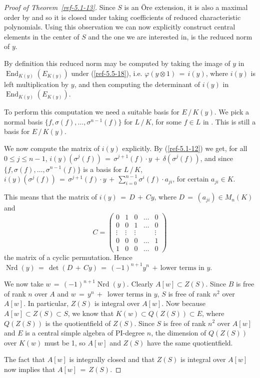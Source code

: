 \documentclass{amsart}
\numberwithin{equation}{section}
\def\End{\operatorname {End}}
\def\End{\operatorname {End}}
\DeclareMathOperator{\Nrd}{Nrd}
\theoremstyle{definition}
\theoremstyle{remark}
\begin{document}
\begin{proof}[Proof of Theorem~\ref{ref-5.1-13}]
 Since $S$ is an \"Ore extension, it is also a maximal order by 
    \cite{MR1} and so it is closed under taking coefficients of 
    reduced characteristic polynomials.
     Using this observation we can now explicitly construct central 
    elements in the center of $S$ and the one we are interested in, is the 
    reduced norm of $y$.
    
By definition this reduced norm may be computed by taking  the image 
    of $y$ in $\End_{K(y)}(E_{K(y)})$ under (\ref{ref-5.5-18}), i.e. 
    $\varphi(y \otimes 1) \,=\, i(y)$, where $i(y)$ is left 
    multiplication by $y$, and then computing the determinant of $i(y)$ 
    in $\End_{K(y)}(E_{K(y)})$.
   
To perform this computation we need a suitable basis for $E \,/\,
    K(y)$. We pick  
    a normal basis  $\{f, \sigma(f), \ldots , \sigma^{n-1}(f) \}$ for 
    $L \,/\, K$, for some $f \in L$ in 
    \cite{Cohn}. This is still a basis for
    $E \,/\, K(y)$.



     We now compute  the matrix of $i(y)$ explicitly.
     By (\ref{ref-5.1-12}) we get, for all $0 \leq j \leq n-1$, 
    $i(y)(\sigma^{j}(f)) \,=\, \sigma^{j+1}(f) \cdot y \,+\, 
    \delta(\sigma^{j}(f))$, and since $\{f, \sigma(f), \ldots , 
    \sigma^{n-1}(f) \}$ is a basis for $L \,/\, K$, 
    $i(y)(\sigma^{j}(f)) \,=\, \sigma^{j+1}(f) \cdot y \,+\, 
    \displaystyle{\sum_{i=0}^{n-1} \sigma^{i}(f) \cdot a_{ji}}$, for 
    certain $a_{ji} \in K$.
    
This means that the matrix of $i(y) \,=\, D \,+\, Cy$, where 
    $D \,=\, (a_{ji}) \in M_{n}(K)$ and 
    \[ C = \left( \begin{array}{ccccc} 0 & 1 & 0 & \ldots & 0 \\ 0 & 
    0 & 1 & \ldots & 0 \\ \vdots & \vdots & \vdots & & \vdots \\ 0 & 
    0 & 0 & \ldots & 1 \\ 1 & 0 & 0 & \ldots & 0 \end{array} \right) \]
    the matrix of a cyclic permutation. 
Hence $\operatorname{Nrd}(y) \,=\, \det(D \,+\, Cy) \,=\, (-1)^{n+1}y^{n} \,+\, \mbox{lower terms 
    in } y$. 
    
     We now take $w \,=\, (-1)^{n+1}\Nrd(y)$. Clearly $A[w] \subset 
    Z(S)$. Since $B$ is free of rank $n$ over $A$ and $w \,=\, y^{n} 
    \,+\, \mbox{ lower terms in } y$, $S$ is free of rank $n^{2}$ 
    over $A[w]$. In particular, $Z(S)$ is integral over $A[w]$. Now 
    because $A[w] \subset Z(S) \subset S$, we know that $K(w) \subset 
    Q(Z(S)) \subset E$, where $Q(Z(S))$ is the quotientfield of $Z(S)$. 
    Since $S$ is free of rank $n^{2}$ over $A[w]$ and $E$ is a central 
    simple algebra of PI-degree $n$, the dimension of $Q(Z(S))$ over 
    $K(w)$ must be 1, so $A[w]$ and $Z(S)$ have the same quotientfield.
    
The fact that $A[w]$ is integrally closed 
    and that $Z(S)$ is integral over $A[w]$ now implies that $A[w] \,=\, 
    Z(S)$.
\end{proof}
\end{document}
